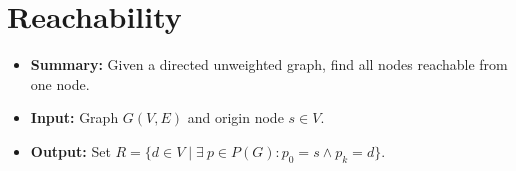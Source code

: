 \section{Reachability} \label{algorithm-reachability}
\begin{itemize}
    \item \textbf{Summary:} Given a directed unweighted graph, find all nodes reachable from one node.
    \item \textbf{Input:} Graph $G(V,E)$ and origin node $s \in V$.
    \item \textbf{Output:} Set $R=\{d \in V \mid \exists~p \in P(G)\colon p_0 = s \wedge p_k = d\}$.
\end{itemize}

